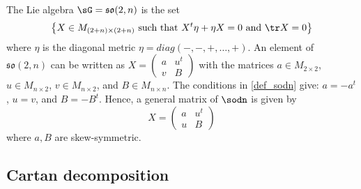 The Lie algebra $\sG=\mathfrak{so}(2,n)$ is the set 
\begin{equation}\label{def_sodn}
\big\{X\in M_{(2+n)\times (2+n)}\textrm{ such that }X^t\eta+\eta X=0\textrm{ and } \tr X=0\big\}
\end{equation}
where $\eta$ is the diagonal metric $\eta=diag(-,-,+,\ldots,+)$. An element of $\mathfrak{so}(2,n)$ can be written as
$
    X=\begin{pmatrix}
a & u ^t \\
v & B
\end{pmatrix}
$
with the matrices $a\in M_{2\times 2}$, $u\in M_{n\times 2}$, $v\in M_{n\times 2}$, and $B\in M_{n\times n}$. The conditions in \eqref{def_sodn} give: $a=-a^t$, $u=v$, and $B=-B^t$. Hence, a general matrix of $\sodn$ is given by
\begin{equation}	\label{eq:gene_sodn}
X=\begin{pmatrix}
a & u^t \\
u & B
\end{pmatrix}
\end{equation}
where $a,B$ are skew-symmetric.

\subsection{Cartan decomposition}		\label{SubSecCartandeuxN}

